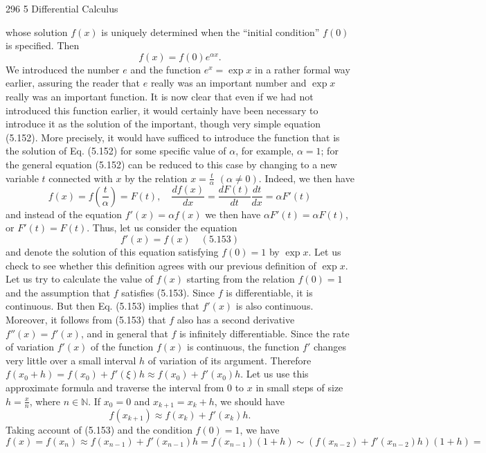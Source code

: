 296 5 Differential Calculus

whose solution $f(x)$ is uniquely determined when the ``initial condition'' $f(0)$ is
specified. Then
$$f(x) = f(0)e^{\alpha x}.$$
We introduced the number $e$ and the function $e^x = \exp x$ in a rather formal way
earlier, assuring the reader that $e$ really was an important number and $\exp x$ really
was an important function. It is now clear that even if we had not introduced this
function earlier, it would certainly have been necessary to introduce it as the solution
of the important, though very simple equation (5.152). More precisely, it would have
sufficed to introduce the function that is the solution of Eq. (5.152) for some specific
value of $\alpha$, for example, $\alpha = 1$; for the general equation (5.152) can be reduced to
this case by changing to a new variable $t$ connected with $x$ by the relation $x = \frac{t}{\alpha}$
$(\alpha \ne 0)$.
Indeed, we then have
$$f(x) = f\left(\frac{t}{\alpha}\right) = F(t), \quad \frac{df(x)}{dx} = \frac{dF(t)}{dt} \frac{dt}{dx} = \alpha F'(t)$$
and instead of the equation $f'(x) = \alpha f(x)$ we then have $\alpha F'(t) = \alpha F(t)$, or $F'(t) =
F(t)$.
Thus, let us consider the equation
$$f'(x) = f(x) \quad (5.153)$$
and denote the solution of this equation satisfying $f(0) = 1$ by $\exp x$.
Let us check to see whether this definition agrees with our previous definition of
$\exp x$.
Let us try to calculate the value of $f(x)$ starting from the relation $f(0) = 1$ and
the assumption that $f$ satisfies (5.153). Since $f$ is differentiable, it is continuous.
But then Eq. (5.153) implies that $f'(x)$ is also continuous. Moreover, it follows
from (5.153) that $f$ also has a second derivative $f''(x) = f'(x)$, and in general that
$f$ is infinitely differentiable. Since the rate of variation $f'(x)$ of the function $f(x)$
is continuous, the function $f'$ changes very little over a small interval $h$ of variation
of its argument. Therefore $f(x_0 + h) = f(x_0) + f'(\xi)h \approx f(x_0) + f'(x_0)h$. Let us
use this approximate formula and traverse the interval from $0$ to $x$ in small steps of
size $h = \frac{x}{n}$, where $n \in \mathbb{N}$. If $x_0 = 0$ and $x_{k+1} = x_k + h$, we should have
$$f(x_{k+1}) \approx f(x_k) + f'(x_k)h.$$
Taking account of (5.153) and the condition $f(0) = 1$, we have
$$f(x) = f(x_n) \approx f(x_{n-1}) + f'(x_{n-1})h = f(x_{n-1})(1 + h) \sim (f(x_{n-2}) + f'(x_{n-2})h) (1 + h) =$$